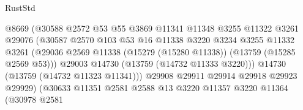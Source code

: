 \begin{lexlean}{RustStd}
\begin{coremodule}
                                          @8669
                                          (@30588
                                            @2572
                                            @53
                                            @55
                                            @3869
                                            @11341
                                            @11348
                                            @3255
                                            @11322
                                            @3261
                                            @29076
                                            (@30587
                                              @2570
                                              @103
                                              @53
                                              @16
                                              @11338
                                              @3220
                                              @3234
                                              @3255
                                              @11332
                                              @3261
                                              (@29036
                                                @2569
                                                @11338
                                                (@15279 (@15280 @11338))
                                                (@13759 (@15285 @2569 @53)))
                                              @29003
                                              @14730
                                              (@13759 (@14732 @11333 @3220)))
                                            @14730
                                            (@13759 (@14732 @11323 @11341)))
                                          @29908
                                          @29911
                                          @29914
                                          @29918
                                          @29923
                                          @29929)
                                        (@30633
                                          @11351
                                          @2581
                                          @2588
                                          @13
                                          @3220
                                          @11357
                                          @3220
                                          @11364
                                          (@30978
                                            @2581

\end{coremodule}
\end{lexlean}
